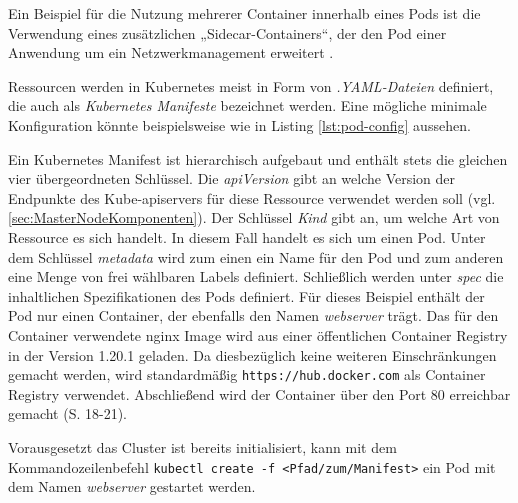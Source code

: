 \documentclass[11pt,a4paper]{article}
\begin{document}
Ein Beispiel für die Nutzung mehrerer Container innerhalb eines Pods ist die Verwendung
eines zusätzlichen „Sidecar-Containers“, der den Pod einer Anwendung um ein Netzwerkmanagement erweitert \cite{9783969109625}.

Ressourcen werden in Kubernetes meist in Form von \emph{.YAML-Dateien} definiert,
die auch als \emph{Kubernetes Manifeste} bezeichnet werden.
Eine mögliche minimale Konfiguration könnte beispielsweise wie in Listing \ref{lst:pod-config} aussehen.



Ein Kubernetes Manifest ist hierarchisch aufgebaut
und enthält stets die gleichen vier übergeordneten Schlüssel.
Die \emph{apiVersion} gibt an welche Version der Endpunkte des Kube-apiservers für diese Ressource
verwendet werden soll (vgl. \ref{sec:MasterNodeKomponenten}).
Der Schlüssel \emph{Kind} gibt an, um welche Art von Ressource es sich handelt.
In diesem Fall handelt es sich um einen Pod.
Unter dem Schlüssel \emph{metadata} wird zum einen ein Name für den Pod
und zum anderen eine Menge von frei wählbaren Labels definiert.
Schließlich werden unter \emph{spec} die inhaltlichen Spezifikationen des Pods
definiert. Für dieses Beispiel enthält der Pod nur einen Container, der ebenfalls den Namen
\emph{webserver} trägt. Das für den Container verwendete nginx Image \cite{nginx} wird aus einer
öffentlichen Container Registry in der Version 1.20.1 geladen. Da diesbezüglich keine weiteren
Einschränkungen gemacht werden, wird standardmäßig \linebreak \lstinline|https://hub.docker.com| als Container Registry
verwendet. Abschließend wird der Container über den Port 80 erreichbar gemacht \cite{Schmeling_Dargatz_2022} (S. 18-21).

Vorausgesetzt das Cluster ist bereits initialisiert, kann mit dem Kommandozeilenbefehl
\lstinline|kubectl create -f <Pfad/zum/Manifest>|
ein Pod mit dem Namen \emph{webserver} gestartet werden.
\end{document}
